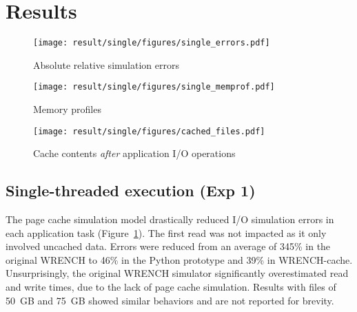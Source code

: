 \documentclass[conference]{IEEEtran}
\newcommand{\wrench}{WRENCH\xspace}
\begin{document}


    \section{Results}
    \label{results}

    \begin{figure*}
        \centering
        \begin{subfigure}{\linewidth}
            \centering
               \texttt{[image: result/single/figures/single\_errors.pdf]}
               \vspace*{-0.7cm}
               \caption{Absolute relative simulation errors}
               \vspace*{0.5cm}
               \label{fig:single_error}
            \end{subfigure}
        \begin{subfigure}{\linewidth}
            \centering
               \texttt{[image: result/single/figures/single\_memprof.pdf]}
               \vspace*{-0.7cm}
               \caption{Memory profiles}
               \vspace*{0.5cm}
               \label{fig:single_memprof}
        \end{subfigure}
        \begin{subfigure}{\linewidth}
            \centering
               \texttt{[image: result/single/figures/cached\_files.pdf]}
               \caption{Cache contents \emph{after} application I/O operations}
               \label{fig:single_cache}
        \end{subfigure}
        \caption{Single-threaded results (\textit{Exp 1})}
        \end{figure*}


        \subsection{Single-threaded execution (Exp 1)}

        The page cache simulation model drastically reduced I/O simulation
        errors in each application task (Figure~\ref{fig:single_error}). The first read was not impacted
        as it only involved uncached data. Errors were reduced from an average
        of 345\% in the original \wrench to 46\% in the Python prototype and
        39\% in \wrench-cache. Unsurprisingly, the original \wrench simulator
        significantly overestimated read and write times, due to the lack
        of page cache simulation. Results with files of 50~GB and 75~GB
        showed similar behaviors and are not reported for brevity.
\end{document}
